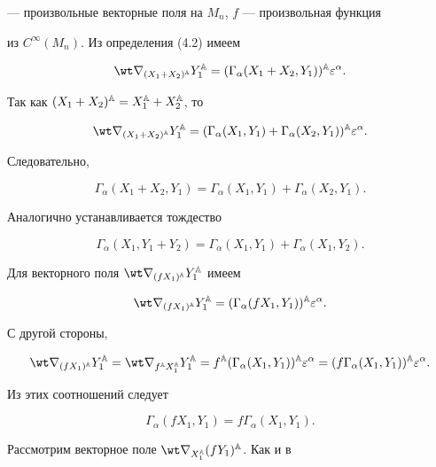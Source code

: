 --- произвольные векторные поля на $M_n$, $f$ --- произвольная функция 


из $C^\infty(M_n)$. Из определения (4.2) имеем 


$$ 


\wt\nabla_{(X_1+X_2)\A}Y\A_1=(\Gamma_\alpha(X_1+X_2,Y_1))\A 


\varepsilon^\alpha. 


$$ 


Так как $(X_1+X_2)^{\Bbb A}=X^{\Bbb A}_1+X^{\Bbb A}_2$, то 


$$ 


\wt\nabla_{(X_1+X_2)\A}Y\A_1=(\Gamma_\alpha(X_1,Y_1)+ 


\Gamma_\alpha(X_2,Y_1))\A\varepsilon^\alpha. 


$$ 


Следовательно, 


$$ 


\Gamma_\alpha(X_1+X_2,Y_1)=\Gamma_\alpha(X_1,Y_1)+ 


\Gamma_\alpha(X_2,Y_1). 


$$ 


Аналогично устанавливается тождество 


$$ 


\Gamma_\alpha(X_1,Y_1+Y_2)=\Gamma_\alpha(X_1,Y_1)+ 


\Gamma_\alpha(X_1,Y_2). 


$$ 


Для векторного поля $\wt\nabla_{(fX_1)\A}Y\A_1$ имеем 


$$ 


\wt\nabla_{(fX_1)\A}Y\A_1=(\Gamma_\alpha(fX_1,Y_1))\A 


\varepsilon^\alpha. 


$$ 


С другой стороны,


$$ 


\wt\nabla_{(fX_1)\A}Y\A_1=\wt\nabla_{f\A X\A_1}Y\A_1= 


f\A(\Gamma_\alpha(X_1,Y_1))\A\varepsilon^\alpha= 


(f\Gamma_\alpha(X_1,Y_1))\A\varepsilon^\alpha. 


$$ 


Из этих соотношений следует 


$$ 


\Gamma_\alpha(fX_1,Y_1)=f\Gamma_\alpha(X_1,Y_1). 


$$ 


 


Рассмотрим векторное поле $\wt\nabla_{X\A_1}(fY_1)\A$. Как и в 


